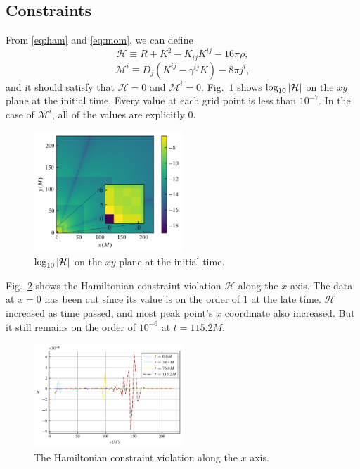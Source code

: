 \documentclass[%
 reprint,
 amsmath,amssymb,
 aps,
 prd,
]{revtex4-2}
\begin{document}
\subsection{Constraints}

From \eqref{eq:ham} and \eqref{eq:mom}, we can define
\begin{equation}
	\mathcal{H} \equiv R + K^2 - K_{ij}K^{ij} - 16\pi \rho,
\end{equation}
\begin{equation}
	\mathcal{M}^i \equiv D_j (K^{ij} - \gamma^{ij}K) - 8\pi j^i,
\end{equation}
and it should satisfy that $\mathcal{H} = 0$ and $\mathcal{M}^i = 0$. Fig.~\ref{fig:ham_xy} shows $\log_{10}\qty|\mathcal{H}|$ on the $xy$ plane at the initial time. Every value at each grid point is less than $10^{-7}$. In the case of $\mathcal{M}^i$, all of the values are explicitly 0.

\begin{figure}[ht!]
	\includegraphics[width=0.5\textwidth]{data/ham_xy.png}%
	\caption{\label{fig:ham_xy} $\log_{10}\qty|\mathcal{H}|$ on the $xy$ plane at the initial time.}
\end{figure}

Fig.~\ref{fig:ham_evol} shows the Hamiltonian constraint violation $\mathcal{H}$ along the $x$ axis. The data at $x=0$ has been cut since its value is on the order of $1$ at the late time. $\mathcal{H}$ increased as time passed, and most peak point's $x$ coordinate also increased. But it still remains on the order of $10^{-6}$ at $t=115.2M$.
\begin{figure}[ht!]
	\includegraphics[width=0.5\textwidth]{data/ham_evol.png}%
	\caption{\label{fig:ham_evol} The Hamiltonian constraint violation along the $x$ axis.}
\end{figure}
\end{document}
